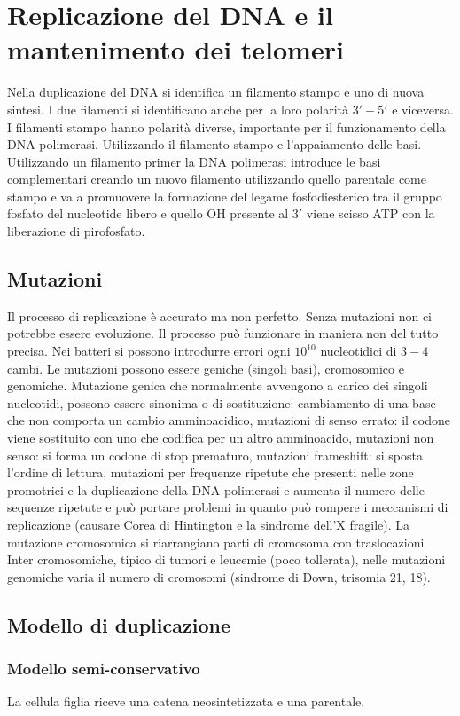 \chapter{Replicazione del DNA e il mantenimento dei telomeri}
Nella duplicazione del DNA si identifica un filamento stampo e uno di nuova sintesi. I due filamenti si identificano anche per la loro polarit\`a $3'-5'$ e viceversa. I filamenti stampo
hanno polarit\`a diverse, importante per il funzionamento della DNA polimerasi. Utilizzando il filamento stampo e l'appaiamento delle basi. Utilizzando un filamento primer la DNA
polimerasi introduce le basi complementari creando un nuovo filamento utilizzando quello parentale come stampo e va a promuovere la formazione del legame fosfodiesterico tra il gruppo
fosfato del nucleotide libero e quello OH presente al $3'$ viene scisso ATP con la liberazione di pirofosfato. 
\section{Mutazioni}
Il processo di replicazione \`e accurato ma non perfetto. Senza mutazioni non ci potrebbe essere evoluzione. Il processo pu\`o funzionare in maniera non del tutto precisa. Nei batteri
si possono introdurre errori ogni $10^{10}$ nucleotidici di $3-4$ cambi. Le mutazioni possono essere geniche (singoli basi), cromosomico e genomiche. Mutazione genica che normalmente 
avvengono a carico dei singoli nucleotidi, possono essere sinonima o di sostituzione: cambiamento di una base che non comporta un cambio amminoacidico, mutazioni di senso errato: il
codone viene sostituito con uno che codifica per un altro amminoacido, mutazioni non senso: si forma un codone di stop prematuro, mutazioni frameshift: si sposta l'ordine di lettura, 
mutazioni per frequenze ripetute che presenti nelle zone promotrici e la duplicazione della DNA polimerasi e aumenta il numero delle sequenze ripetute e pu\`o portare problemi in quanto
pu\`o rompere i meccanismi di replicazione (causare Corea di Hintington e la sindrome dell'X fragile). La mutazione cromosomica si riarrangiano parti di cromosoma con traslocazioni 
Inter cromosomiche, tipico di tumori e leucemie (poco tollerata), nelle mutazioni genomiche varia il numero di cromosomi (sindrome di Down, trisomia 21, 18). 
\section{Modello di duplicazione}
\subsection{Modello semi-conservativo}
La cellula figlia riceve una catena neosintetizzata e una parentale.
